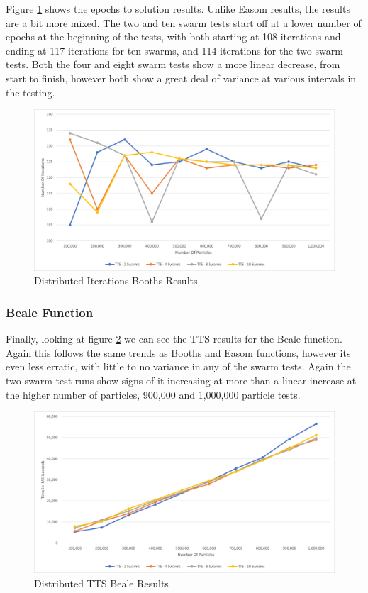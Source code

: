 \documentclass[oneside,12pt]{book}
\begin{document}
Figure \ref{fig:Distributed_Epoc_Booths_Results} shows the epochs to solution results. Unlike Easom results, the results are a bit more mixed. The two and ten swarm tests start off at a lower number of epochs at the beginning of the tests, with both starting at 108 iterations and ending at 117 iterations for ten swarms, and 114 iterations for the two swarm tests. Both the four and eight swarm tests show a more linear decrease, from start to finish, however both show a great deal of variance at various intervals in the testing. 

\begin{figure}[H]
    \centering
    \includegraphics[scale=0.45]{Images/Graphs/DistributedBoothsEpoch.png}
    \caption{Distributed Iterations Booths Results}
    \label{fig:Distributed_Epoc_Booths_Results}
\end{figure}

\subsubsection{Beale Function}
Finally, looking at figure \ref{fig:Distributed_TTS_Beale_Results} we can see the TTS results for the Beale function. Again this follows the same trends as Booths and Easom functions, however its even less erratic, with little to no variance in any of the swarm tests. Again the two swarm test runs show signs of it increasing at more than a linear increase at the higher number of particles, 900,000 and 1,000,000 particle tests. 
\begin{figure}[H]
    \centering
    \includegraphics[scale=0.45]{Images/Graphs/DistributedBealeTTS.png}
    \caption{Distributed TTS Beale Results}
    \label{fig:Distributed_TTS_Beale_Results}
\end{figure}
\end{document}
